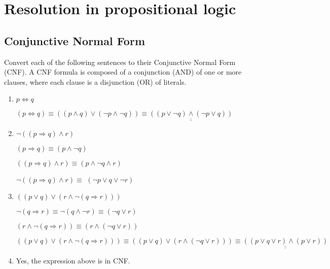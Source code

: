 \section{Resolution in propositional logic}
\subsection{Conjunctive Normal Form}
\begin{large}
    Convert each of the following sentences to their Conjunctive Normal Form (CNF).
    A CNF formula is composed of a conjunction (AND) of one or more clauses, where each clause is a disjunction (OR) of literals.
    \begin{enumerate}
        \item $ p \iff q $

              $ (p \iff q) \equiv ((p \land q) \lor (\neg p \land \neg q)) \equiv \underline{\underline{((p \lor \neg q) \land (\neg p \lor q))}}$

        \item $ \neg ((p \Rightarrow q) \land r) $

              $ (p \Rightarrow q ) \equiv  (p \land \neg q) $

              $ (( p \Rightarrow q) \land r) \equiv  (p \land \neg q \land r) $

              $ \neg ((p \Rightarrow q) \land r) \equiv $ \underline{\underline{$(\neg p \lor q \lor \neg r)$}}

        \item $ ((p \lor q) \lor (r \land \neg(q \Rightarrow r))) $

              $\neg(q \Rightarrow r) \equiv \neg(q \land \neg r) \equiv (\neg q \lor r)$

              $ (r \land \neg(q \Rightarrow r)) \equiv (r \land (\neg q \lor r)) $

              $ ((p \lor q) \lor (r \land \neg(q \Rightarrow r))) \equiv ((p \lor q) \lor (r \land (\neg q \lor r))) \equiv \underline{\underline{((p \lor q \lor r) \land (p \lor r))}} $

        \item Yes, the expression above is in CNF\@.
    \end{enumerate}
\end{large}


